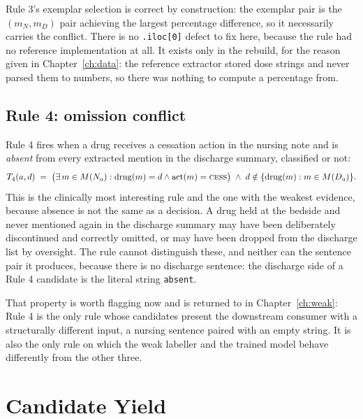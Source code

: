 Rule 3's exemplar selection is correct by construction: the exemplar pair is the
$(m_N, m_D)$ pair achieving the largest percentage difference, so it necessarily
carries the conflict. There is no \texttt{.iloc[0]} defect to fix here, because
the rule had no reference implementation at all. It exists only in the rebuild,
for the reason given in Chapter~\ref{ch:data}: the reference extractor stored
dose strings and never parsed them to numbers, so there was nothing to compute a
percentage from.

\subsection{Rule 4: omission conflict}

Rule 4 fires when a drug receives a cessation action in the nursing note and is
\emph{absent} from every extracted mention in the discharge summary, classified
or not:
\[
T_4(a,d) \;=\;
\bigl(\exists\, m \in M(N_a) : \mathrm{drug}(m) = d \wedge
\mathrm{act}(m) = \textsc{cess}\bigr)
\;\wedge\;
d \notin \{\mathrm{drug}(m) : m \in M(D_a)\}.
\]
This is the clinically most interesting rule and the one with the weakest
evidence, because absence is not the same as a decision. A drug held at the
bedside and never mentioned again in the discharge summary may have been
deliberately discontinued and correctly omitted, or may have been dropped from
the discharge list by oversight. The rule cannot distinguish these, and neither
can the sentence pair it produces, because there is no discharge sentence: the
discharge side of a Rule 4 candidate is the literal string \texttt{absent}.

That property is worth flagging now and is returned to in
Chapter~\ref{ch:weak}: Rule 4 is the only rule whose candidates present the
downstream consumer with a structurally different input, a nursing sentence
paired with an empty string. It is also the only rule on which the weak
labeller and the trained model behave differently from the other three.

\section{Candidate Yield}
\label{sec:cand-yield}

